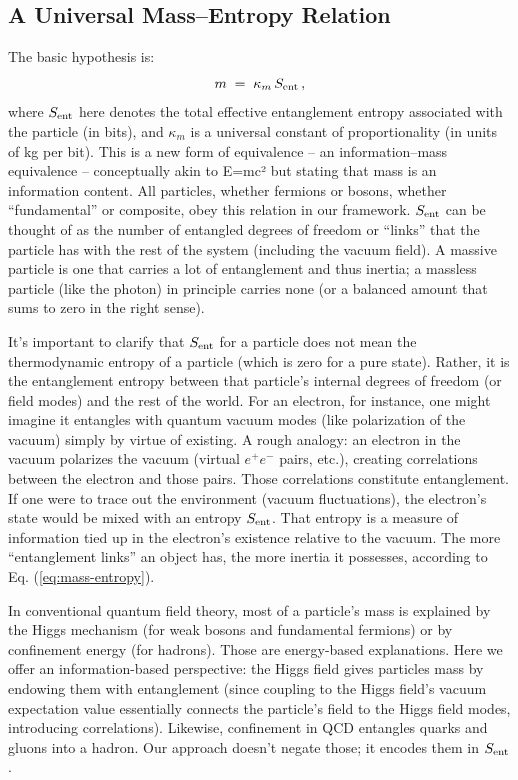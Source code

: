 \documentclass[11pt]{article}
\begin{document}
\subsection{A Universal Mass–Entropy Relation}

The basic hypothesis is: 
\begin{equation}
m \;=\; \kappa_m\, S_{\rm ent} \,, \label{eq:mass-entropy} 
\end{equation}
where $S_{\rm ent}$ here denotes the total effective entanglement entropy associated with the particle (in bits), and $\kappa_m$ is a universal constant of proportionality (in units of kg per bit). This is a new form of equivalence – an information–mass equivalence – conceptually akin to E=mc² but stating that mass is an information content. All particles, whether fermions or bosons, whether “fundamental” or composite, obey this relation in our framework. $S_{\rm ent}$ can be thought of as the number of entangled degrees of freedom or “links” that the particle has with the rest of the system (including the vacuum field). A massive particle is one that carries a lot of entanglement and thus inertia; a massless particle (like the photon) in principle carries none (or a balanced amount that sums to zero in the right sense).

It’s important to clarify that $S_{\rm ent}$ for a particle does not mean the thermodynamic entropy of a particle (which is zero for a pure state). Rather, it is the entanglement entropy between that particle’s internal degrees of freedom (or field modes) and the rest of the world. For an electron, for instance, one might imagine it entangles with quantum vacuum modes (like polarization of the vacuum) simply by virtue of existing. A rough analogy: an electron in the vacuum polarizes the vacuum (virtual $e^+e^-$ pairs, etc.), creating correlations between the electron and those pairs. Those correlations constitute entanglement. If one were to trace out the environment (vacuum fluctuations), the electron’s state would be mixed with an entropy $S_{\rm ent}$. That entropy is a measure of information tied up in the electron’s existence relative to the vacuum. The more “entanglement links” an object has, the more inertia it possesses, according to Eq. (\ref{eq:mass-entropy}).

In conventional quantum field theory, most of a particle’s mass is explained by the Higgs mechanism (for weak bosons and fundamental fermions) or by confinement energy (for hadrons). Those are energy-based explanations. Here we offer an information-based perspective: the Higgs field gives particles mass by endowing them with entanglement (since coupling to the Higgs field’s vacuum expectation value essentially connects the particle’s field to the Higgs field modes, introducing correlations). Likewise, confinement in QCD entangles quarks and gluons into a hadron. Our approach doesn’t negate those; it encodes them in $S_{\rm ent}$.
\end{document}
